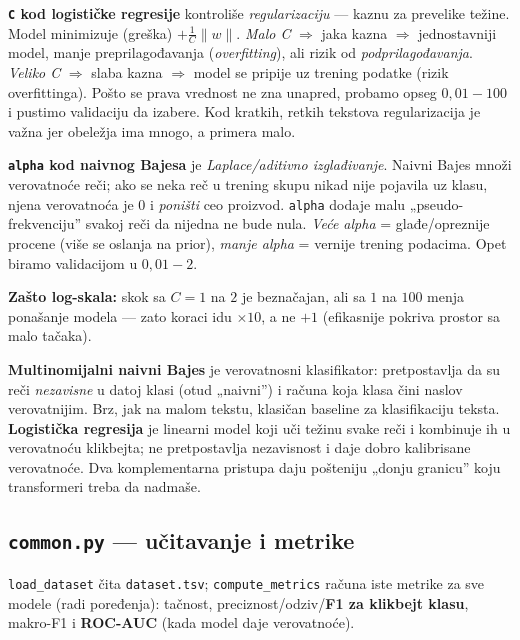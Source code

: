 \documentclass[11pt,a4paper]{article}
\newcommand{\kod}[1]{\texttt{#1}}
\begin{document}
\begin{teorija}
\textbf{\kod{C} kod logističke regresije} kontroliše \emph{regularizaciju} --- kaznu za
prevelike težine. Model minimizuje (greška) $+\frac{1}{C}\lVert w\rVert$. \emph{Malo
C} $\Rightarrow$ jaka kazna $\Rightarrow$ jednostavniji model, manje
preprilagođavanja (\emph{overfitting}), ali rizik od \emph{podprilagođavanja}. \emph{Veliko
C} $\Rightarrow$ slaba kazna $\Rightarrow$ model se pripije uz trening podatke (rizik
overfittinga). Pošto se prava vrednost ne zna unapred, probamo opseg
$0{,}01\!-\!100$ i pustimo validaciju da izabere. Kod kratkih, retkih tekstova
regularizacija je važna jer obeležja ima mnogo, a primera malo.

\medskip
\textbf{\kod{alpha} kod naivnog Bajesa} je \emph{Laplace/aditivno izglađivanje}.
Naivni Bajes množi verovatnoće reči; ako se neka reč u trening skupu nikad nije pojavila
uz klasu, njena verovatnoća je 0 i \emph{poništi} ceo proizvod. \kod{alpha} dodaje malu
„pseudo-frekvenciju'' svakoj reči da nijedna ne bude nula. \emph{Veće alpha} =
glađe/opreznije procene (više se oslanja na prior), \emph{manje alpha} = vernije
trening podacima. Opet biramo validacijom u $0{,}01\!-\!2$.

\medskip
\textbf{Zašto log-skala:} skok sa $C{=}1$ na $2$ je beznačajan, ali sa $1$ na $100$
menja ponašanje modela --- zato koraci idu $\times10$, a ne $+1$ (efikasnije pokriva
prostor sa malo tačaka).
\end{teorija}

\begin{teorija}
\textbf{Multinomijalni naivni Bajes} je verovatnosni klasifikator: pretpostavlja da su
reči \emph{nezavisne} u datoj klasi (otud „naivni'') i računa koja klasa čini naslov
verovatnijim. Brz, jak na malom tekstu, klasičan baseline za klasifikaciju teksta.
\textbf{Logistička regresija} je linearni model koji uči težinu svake reči i kombinuje
ih u verovatnoću klikbejta; ne pretpostavlja nezavisnost i daje dobro kalibrisane
verovatnoće. Dva komplementarna pristupa daju pošteniju „donju granicu'' koju
transformeri treba da nadmaše.
\end{teorija}

\subsection{\texttt{common.py} --- učitavanje i metrike}
\kod{load\_dataset} čita \kod{dataset.tsv}; \kod{compute\_metrics} računa iste metrike
za sve modele (radi poređenja): tačnost, preciznost/odziv/\textbf{F1 za klikbejt
klasu}, makro-F1 i \textbf{ROC-AUC} (kada model daje verovatnoće).
\end{document}
